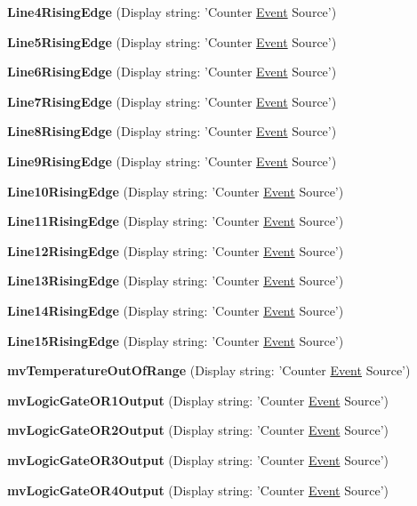 \begin{DoxyItemize}
\item {\bfseries Line4\+Rising\+Edge} (Display string\+: 'Counter \hyperlink{classmv_i_m_p_a_c_t_1_1acquire_1_1_event}{Event} Source')
\item {\bfseries Line5\+Rising\+Edge} (Display string\+: 'Counter \hyperlink{classmv_i_m_p_a_c_t_1_1acquire_1_1_event}{Event} Source')
\item {\bfseries Line6\+Rising\+Edge} (Display string\+: 'Counter \hyperlink{classmv_i_m_p_a_c_t_1_1acquire_1_1_event}{Event} Source')
\item {\bfseries Line7\+Rising\+Edge} (Display string\+: 'Counter \hyperlink{classmv_i_m_p_a_c_t_1_1acquire_1_1_event}{Event} Source')
\item {\bfseries Line8\+Rising\+Edge} (Display string\+: 'Counter \hyperlink{classmv_i_m_p_a_c_t_1_1acquire_1_1_event}{Event} Source')
\item {\bfseries Line9\+Rising\+Edge} (Display string\+: 'Counter \hyperlink{classmv_i_m_p_a_c_t_1_1acquire_1_1_event}{Event} Source')
\item {\bfseries Line10\+Rising\+Edge} (Display string\+: 'Counter \hyperlink{classmv_i_m_p_a_c_t_1_1acquire_1_1_event}{Event} Source')
\item {\bfseries Line11\+Rising\+Edge} (Display string\+: 'Counter \hyperlink{classmv_i_m_p_a_c_t_1_1acquire_1_1_event}{Event} Source')
\item {\bfseries Line12\+Rising\+Edge} (Display string\+: 'Counter \hyperlink{classmv_i_m_p_a_c_t_1_1acquire_1_1_event}{Event} Source')
\item {\bfseries Line13\+Rising\+Edge} (Display string\+: 'Counter \hyperlink{classmv_i_m_p_a_c_t_1_1acquire_1_1_event}{Event} Source')
\item {\bfseries Line14\+Rising\+Edge} (Display string\+: 'Counter \hyperlink{classmv_i_m_p_a_c_t_1_1acquire_1_1_event}{Event} Source')
\item {\bfseries Line15\+Rising\+Edge} (Display string\+: 'Counter \hyperlink{classmv_i_m_p_a_c_t_1_1acquire_1_1_event}{Event} Source')
\item {\bfseries mv\+Temperature\+Out\+Of\+Range} (Display string\+: 'Counter \hyperlink{classmv_i_m_p_a_c_t_1_1acquire_1_1_event}{Event} Source')
\item {\bfseries mv\+Logic\+Gate\+O\+R1\+Output} (Display string\+: 'Counter \hyperlink{classmv_i_m_p_a_c_t_1_1acquire_1_1_event}{Event} Source')
\item {\bfseries mv\+Logic\+Gate\+O\+R2\+Output} (Display string\+: 'Counter \hyperlink{classmv_i_m_p_a_c_t_1_1acquire_1_1_event}{Event} Source')
\item {\bfseries mv\+Logic\+Gate\+O\+R3\+Output} (Display string\+: 'Counter \hyperlink{classmv_i_m_p_a_c_t_1_1acquire_1_1_event}{Event} Source')
\item {\bfseries mv\+Logic\+Gate\+O\+R4\+Output} (Display string\+: 'Counter \hyperlink{classmv_i_m_p_a_c_t_1_1acquire_1_1_event}{Event} Source')
\end{DoxyItemize}


